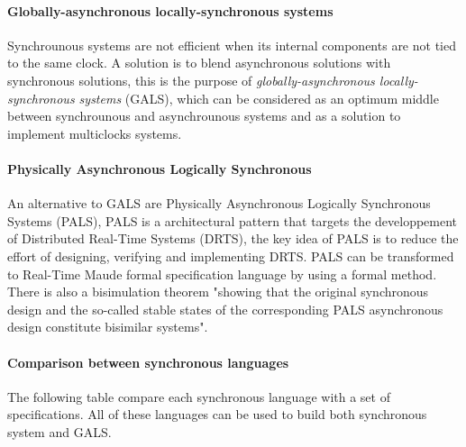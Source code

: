 \paragraph{Globally-asynchronous locally-synchronous systems} Synchrounous systems are not efficient when its internal components are not tied to the same clock. A solution is to blend asynchronous solutions with synchronous solutions, this is the purpose of \textit{globally-asynchronous locally-synchronous systems} (GALS), which can be considered  as an optimum middle between synchrounous and asynchrounous systems and as a solution to implement multiclocks systems. 

\paragraph{Physically Asynchronous Logically Synchronous} An alternative to GALS are Physically Asynchronous Logically Synchronous Systems (PALS), PALS is a architectural pattern that targets the developpement of Distributed Real-Time Systems (DRTS), the key idea of PALS is to reduce the effort of designing, verifying and implementing DRTS. PALS can be transformed to Real-Time Maude formal specification language by using a formal method\cite{PALSPaper}. There is also a bisimulation theorem "showing that the original synchronous design and the so-called stable states of the corresponding PALS asynchronous design constitute bisimilar systems"\cite{PALSPaper}.

\paragraph{Comparison between synchronous languages}

The following table compare each synchronous language with a set of specifications. All of these languages can be used to build both synchronous system and GALS.


